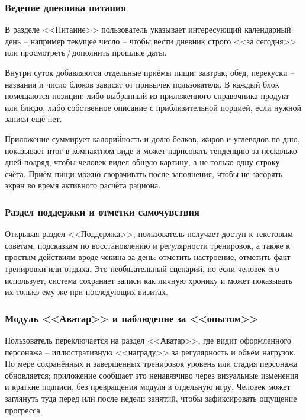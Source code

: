 \subsubsection{Ведение дневника питания}

В разделе <<Питание>> пользователь указывает интересующий календарный день -- например текущее число -- чтобы вести дневник строго <<за сегодня>> или просмотреть\,/\,дополнить прошлые даты.

Внутри суток добавляются отдельные приёмы пищи: завтрак, обед, перекуски -- названия и число блоков зависят от привычек пользователя. В каждый блок помещаются позиции: либо выбранный из приложенного справочника продукт или блюдо, либо собственное описание с приблизительной порцией, если нужной записи ещё нет.

Приложение суммирует калорийность и долю белков, жиров и углеводов по дню, показывает итог в компактном виде и может нарисовать тенденцию за несколько дней подряд, чтобы человек видел общую картину, а не только одну строку счёта. Приём пищи можно сворачивать после заполнения, чтобы не засорять экран во время активного расчёта рациона.

\subsubsection{Раздел поддержки и отметки самочувствия}

Открывая раздел <<Поддержка>>, пользователь получает доступ к текстовым советам, подсказкам по восстановлению и регулярности тренировок, а также к простым действиям вроде чекина за день: отметить настроение, отметить факт тренировки или отдыха. Это необязательный сценарий, но если человек его использует, система сохраняет записи как личную хронику и может показывать их только ему же при последующих визитах.

\subsubsection{Модуль <<Аватар>> и наблюдение за <<опытом>>}

Пользователь переключается на раздел <<Аватар>>, где видит оформленного персонажа -- иллюстративную <<награду>> за регулярность и объём нагрузок. По мере сохранённых и завершённых тренировок уровень или стадия персонажа обновляется; приложение сообщает это ненавязчиво через визуальные изменения и краткие подписи, без превращения модуля в отдельную игру. Человек может заглянуть туда перед или после недели занятий, чтобы зафиксировать ощущение прогресса.

